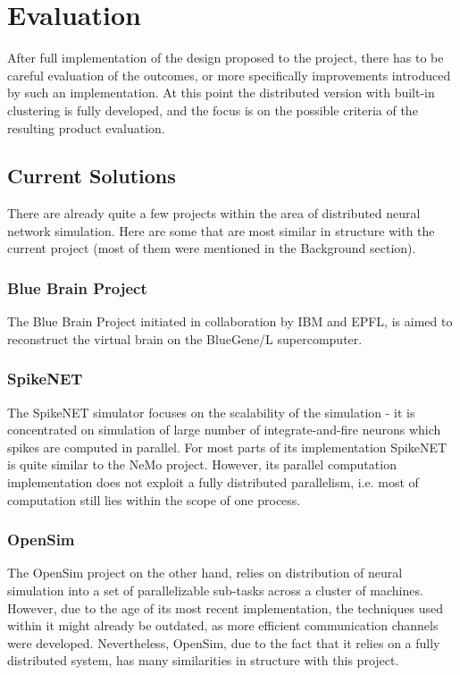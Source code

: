 \chapter{Evaluation}

After full implementation of the design proposed to the project, there has to be careful evaluation of the outcomes, or more specifically improvements introduced by such an implementation. At this point the distributed version with built-in clustering is fully developed, and the focus is on the possible criteria of the resulting product evaluation.

\section{Current Solutions}

There are already quite a few projects within the area of distributed neural network simulation. Here are some that are most similar in structure with the current project (most of them were mentioned in the Background section).

\subsection{Blue Brain Project}

The Blue Brain Project initiated in collaboration by IBM and EPFL, is aimed to reconstruct the virtual brain on the BlueGene/L supercomputer.\cite{BlueBrain}

\subsection{SpikeNET}

The SpikeNET simulator focuses on the scalability of the simulation - it is concentrated on simulation of large number of integrate-and-fire neurons which spikes are computed in parallel\cite{ArnaudDelorme1999}. For most parts of its implementation SpikeNET is quite similar to the NeMo project. However, its parallel computation implementation does not exploit a fully distributed parallelism, i.e. most of computation still lies within the scope of one process.

\subsection{OpenSim}

The OpenSim project on the other hand, relies on distribution of neural simulation into a set of parallelizable sub-tasks across a cluster of machines\cite{OpenSim}. However, due to the age of its most recent implementation, the techniques used within it might already be outdated, as more efficient communication channels were developed. Nevertheless, OpenSim, due to the fact that it relies on a fully distributed system, has many similarities in structure with this project. \\ \\


